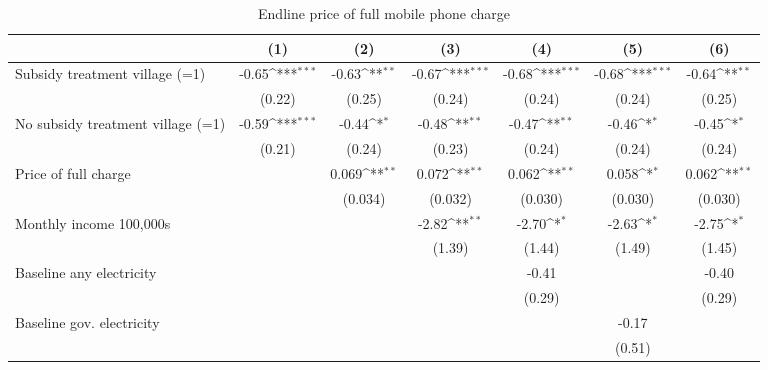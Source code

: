 \begin{table}[htbp]\centering
\def\sym#1{\ifmmode^{#1}\else\(^{#1}\)\fi}
\caption{Endline price of full mobile phone charge}
\begin{tabular*}{1\hsize}{@{\hskip\tabcolsep\extracolsep\fill}l*{6}{c}}
\toprule
                &\multicolumn{1}{c}{(1)}         &\multicolumn{1}{c}{(2)}         &\multicolumn{1}{c}{(3)}         &\multicolumn{1}{c}{(4)}         &\multicolumn{1}{c}{(5)}         &\multicolumn{1}{c}{(6)}         \\
\midrule
Subsidy treatment village (=1)&    -0.65\sym{***}&    -0.63\sym{**} &    -0.67\sym{***}&    -0.68\sym{***}&    -0.68\sym{***}&    -0.64\sym{**} \\
                &   (0.22)         &   (0.25)         &   (0.24)         &   (0.24)         &   (0.24)         &   (0.25)         \\
No subsidy treatment village (=1)&    -0.59\sym{***}&    -0.44\sym{*}  &    -0.48\sym{**} &    -0.47\sym{**} &    -0.46\sym{*}  &    -0.45\sym{*}  \\
                &   (0.21)         &   (0.24)         &   (0.23)         &   (0.24)         &   (0.24)         &   (0.24)         \\
Price of full charge&                  &    0.069\sym{**} &    0.072\sym{**} &    0.062\sym{**} &    0.058\sym{*}  &    0.062\sym{**} \\
                &                  &  (0.034)         &  (0.032)         &  (0.030)         &  (0.030)         &  (0.030)         \\
Monthly income 100,000s&                  &                  &    -2.82\sym{**} &    -2.70\sym{*}  &    -2.63\sym{*}  &    -2.75\sym{*}  \\
                &                  &                  &   (1.39)         &   (1.44)         &   (1.49)         &   (1.45)         \\
Baseline any electricity&                  &                  &                  &    -0.41         &                  &    -0.40         \\
                &                  &                  &                  &   (0.29)         &                  &   (0.29)         \\
Baseline gov. electricity&                  &                  &                  &                  &    -0.17         &                  \\
                &                  &                  &                  &                  &   (0.51)         &                  \\

\end{tabular*}
\end{table}
